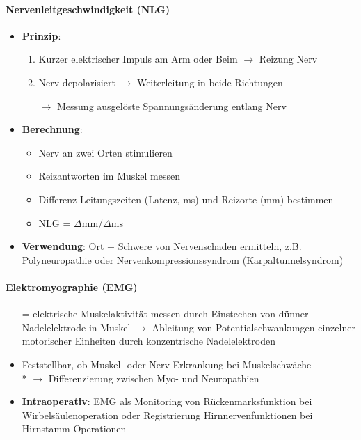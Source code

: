 \paragraph{Nervenleitgeschwindigkeit (NLG)}
\begin{itemize}
  \item \textbf{Prinzip}:
  \begin{enumerate}
    \item Kurzer elektrischer Impuls am Arm oder Beim \( \to \) Reizung Nerv
    \item Nerv depolarisiert \( \to \) Weiterleitung in beide Richtungen
    \item[\( \to \)] Messung ausgelöste Spannungsänderung entlang Nerv
  \end{enumerate}
  \item \textbf{Berechnung}:
  \begin{itemize}
    \item Nerv an zwei Orten stimulieren
    \item Reizantworten im Muskel messen
    \item Differenz Leitungszeiten (Latenz, ms) und Reizorte (mm) bestimmen
    \item NLG = \( \Delta \text{mm} / \Delta \text{ms} \)
  \end{itemize}
  \item \textbf{Verwendung}: Ort + Schwere von Nervenschaden ermitteln, z.B. Polyneuropathie oder Nervenkompressionssyndrom (Karpaltunnelsyndrom)
\end{itemize}

\paragraph{Elektromyographie (EMG)}
\begin{itemize}
  \item[=] elektrische Muskelaktivität messen durch Einstechen von dünner Nadelelektrode in Muskel \( \to \) Ableitung von Potentialschwankungen einzelner motorischer Einheiten durch konzentrische Nadelelektroden
  \item Feststellbar, ob Muskel- oder Nerv-Erkrankung bei Muskelschwäche \\* \( \to \) Differenzierung zwischen Myo- und Neuropathien 
  \item \textbf{Intraoperativ}: EMG als Monitoring von Rückenmarksfunktion bei Wirbelsäulenoperation oder Registrierung Hirnnervenfunktionen bei Hirnstamm-Operationen
\end{itemize}

